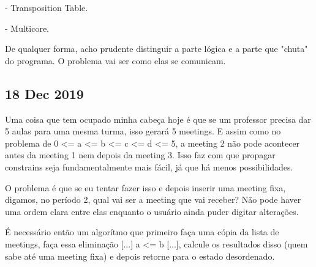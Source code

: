 \documentclass{article}
\begin{document}
- Transposition Table.

- Multicore.

De qualquer forma, acho prudente distinguir a parte lógica e a parte que
"chuta" do programa. O problema vai ser como elas se comunicam.

\subsection{18 Dec 2019}

\par Uma coisa que tem ocupado minha cabeça hoje é que se um professor
precisa dar 5 aulas para uma mesma turma, isso gerará 5 meetings. E assim
como no problema de 0 <= a <= b <= c <= d <= 5,  a meeting 2 não pode acontecer
antes da meeting 1 nem depois da meeting 3. Isso faz com que propagar
constrains seja fundamentalmente mais fácil, já que há menos possibilidades.

\par O problema é que se eu tentar fazer isso e depois inserir uma meeting
fixa, digamos, no período 2, qual vai ser a meeting que vai receber? Não
pode haver uma ordem clara entre elas enquanto o usuário ainda puder digitar
alterações.

\par É necessário então um algorítmo que primeiro faça uma cópia da lista de
meetings, faça essa eliminação [...] a <= b [...], calcule os resultados disso
(quem sabe até uma meeting fixa) e depois retorne para o estado desordenado.
\end{document}
